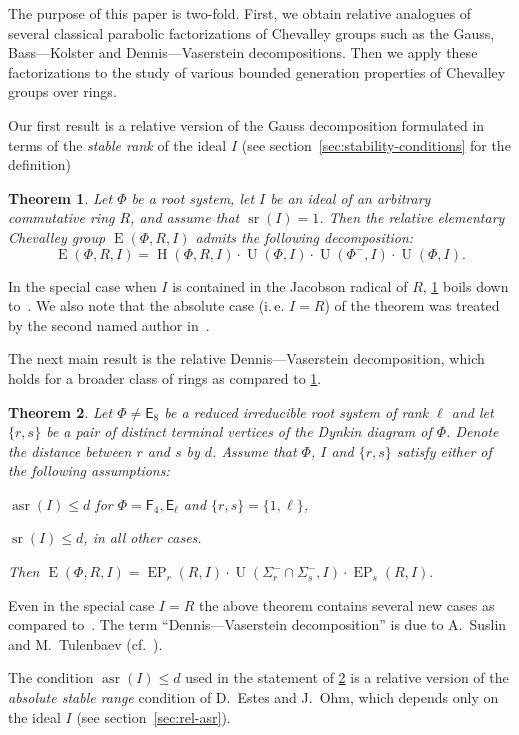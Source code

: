 \documentclass[oneside, 12pt]{amsart}
\theoremstyle{plain}
\newtheorem{thm}{Theorem}
\numberwithin{equation}{section}
\numberwithin{lemma}{section}
\theoremstyle{definition}
\theoremstyle{remark}
\DeclareMathOperator{\E}{E}
\DeclareMathOperator{\EP}{EP}
\DeclareMathOperator{\Hh}{H}
\DeclareMathOperator{\U}{U}
\DeclareMathOperator{\sr}{sr}
\DeclareMathOperator{\asr}{asr}
\newcommand{\rE}{\mathsf{E}}
\newcommand{\rF}{\mathsf{F}}
\begin{document}
The purpose of this paper is two-fold. 
First, we obtain relative analogues of several classical parabolic factorizations of Chevalley groups such as the Gauss, Bass---Kolster and Dennis---Vaserstein decompositions.
Then we apply these factorizations to the study of various bounded generation properties of Chevalley groups over rings.

Our first result is a relative version of the Gauss decomposition formulated in terms of the \emph{stable rank} of the ideal $I$ (see section~\ref{sec:stability-conditions} for the definition)
\begin{thm}\label{thm:srRI1}
Let $\Phi$ be a root system, let $I$ be an ideal of an arbitrary commutative ring $R$, and assume that $\sr(I)=1$.
Then the relative elementary Chevalley group $\E(\Phi, R, I)$ admits the following decomposition:
\[ \E(\Phi, R, I) = \Hh(\Phi, R, I) \cdot \U(\Phi, I) \cdot \U(\Phi^-, I) \cdot \U(\Phi, I). \]
\end{thm}
In the special case when $I$ is contained in the Jacobson radical of $R$, \cref{thm:srRI1} boils down to~\cite[Proposition~2.3]{Abe76}. 
We also note that the absolute case (i.\,e. $I=R$) of the theorem was treated by the second named author in~\cite{Sm12}.

The next main result is the relative Dennis---Vaserstein decomposition, which holds for a broader class of rings as compared to \cref{thm:srRI1}.
\begin{thm}\label{thm:DennisVaserstein}
Let $\Phi \neq \rE_8$ be a reduced irreducible root system of rank $\ell$ and let $\{ r, s \}$ be a pair of distinct terminal vertices of the Dynkin diagram of $\Phi$. Denote the distance between $r$ and $s$ by $d$.
Assume that $\Phi$, $I$ and $\{r, s\}$ satisfy either of the following assumptions:
\begin{thmlist}
 \item $\asr(I) \leqslant d$ for $\Phi=\rF_4, \rE_\ell$ and $\{r, s\} = \{1, \ell \}$, 
 \item $\sr(I) \leqslant d$, in all other cases.
\end{thmlist}
Then $\E(\Phi, R, I) = \EP_r(R, I) \cdot \U(\Sigma^-_r \cap \Sigma^-_s, I) \cdot \EP_s(R, I).$ \end{thm}
Even in the special case $I=R$ the above theorem contains several new cases as compared to~\cite[Theorems~2.5 and~4.1]{St78}.
The term ``Dennis---Vaserstein decomposition'' is due to A.~Suslin and M.~Tulenbaev (cf.~\cite[Lemma~2.1]{ST76}).

The condition $\asr(I) \leq d$ used in the statement of \cref{thm:DennisVaserstein} is a relative version of the \emph{absolute stable range} condition of D.~Estes and J.~Ohm, which depends only on the ideal $I$ (see section~\ref{sec:rel-asr}).
\end{document}
